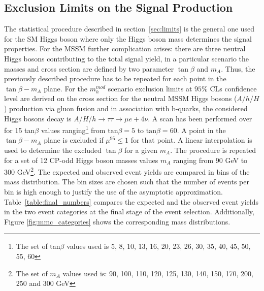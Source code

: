 \subsection{Exclusion Limits on the Signal Production}
The statistical procedure described in section~\ref{sec:limits} is  the general one used for the SM Higgs
boson where only the Higgs boson mass determines the signal properties. For the MSSM further complication
arises:  there are three neutral Higgs bosons contributing to the total signal yield,
in a particular scenario the masses and cross section are defined 
by two parameter $\tan \beta$ and $m_A$. Thus, the previously described procedure
 has to be repeated for each point in the $\tan \beta - m_A$ plane. 
For the $m_h^{mod}$ scenario exclusion limits at $95\%$ CLs confidence level 
are derived on the cross section for the neutral MSSM Higgs bosons ($A/h/H$) production via gluon fusion and in association
with b-quarks,  the considered Higgs bosons decay is $A$/$H$/$h\to\tau\tau\to \mu e + 4\nu$. 
A scan has been performed over for 15 tan$\beta$ values ranging\footnote{
			The set of  tan$\beta$ values used
			is 5, 8, 10, 13, 16, 20, 23, 26, 30, 35, 40, 45, 50, 55, 60}  
from $\mathrm{tan}\beta=5$ to $\mathrm{tan}\beta=60$.
A point in the  $\tan \beta - m_A$ plane is excluded if $\mu^{95} \leq 1$ for that point.
A linear interpolation is used to determine the excluded $\tan \beta$ for a given $m_A$.
The procedure is repeated for a set of 12 CP-odd Higgs boson masses values $m_A$ ranging from 90 GeV 
to 300 GeV\footnote{ The set of $m_A$ values used is: 90, 100, 110, 120, 125, 130,
			140, 150, 170, 200, 250 and 300 GeV}.
The expected and observed event yields are compared in bins of the \mmc mass distribution. The bin sizes are
 chosen such that the number of events per bin is high enough to justify the use of the 
asymptotic approximation.
Table~\ref{table:final_numbers} compares the expected and the observed event yields in 
 the two event categories at the final
stage of the event selection. Additionally, Figure \ref{fig:mmc_categories} shows the corresponding 
\mmc mass distributions.

